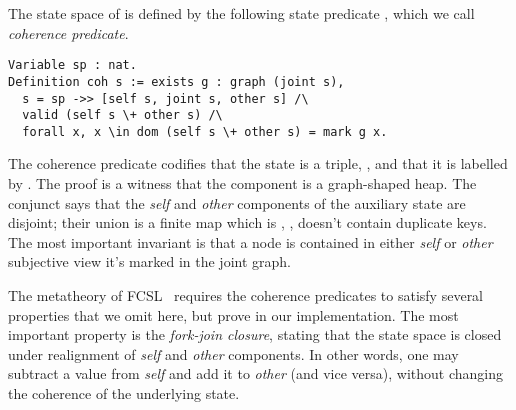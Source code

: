 The state space of  is defined by the following state
predicate , which we call \emph{coherence predicate}.

%
%
%
\begin{lstlisting}
Variable sp : nat.
Definition coh s := exists g : graph (joint s), 
  s = sp ->> [self s, joint s, other s] /\ 
  valid (self s \+ other s) /\ 
  forall x, x \in dom (self s \+ other s) = mark g x.  
\end{lstlisting}
%
The coherence predicate codifies that the state  is a triple,
\code{[self s,}  \code{other s]}, and that it is
labelled by \code{sp}. The proof \code{g} is a witness that the
\code{joint} component is a graph-shaped heap.
%
The conjunct  says that the
\emph{self} and \emph{other} components of the auxiliary state are
disjoint; their union is a finite map which is \code{valid}, \ie,
doesn't contain duplicate keys.
%
The most important invariant is that a node  is contained in
either \emph{self} or \emph{other} subjective view \Iff it's marked in
the joint graph.
%

The metatheory of FCSL~\cite[\S4]{Nanevski-al:ESOP14} requires the
coherence predicates to satisfy several properties that we omit
here, but prove in our implementation. The most important property is
the \emph{fork-join closure}, stating that the state space is closed
under realignment of \emph{self} and \emph{other} components. In other
words, one may subtract a value from \emph{self} and add it to
\emph{other} (and vice versa), without changing the coherence of the
underlying state.


